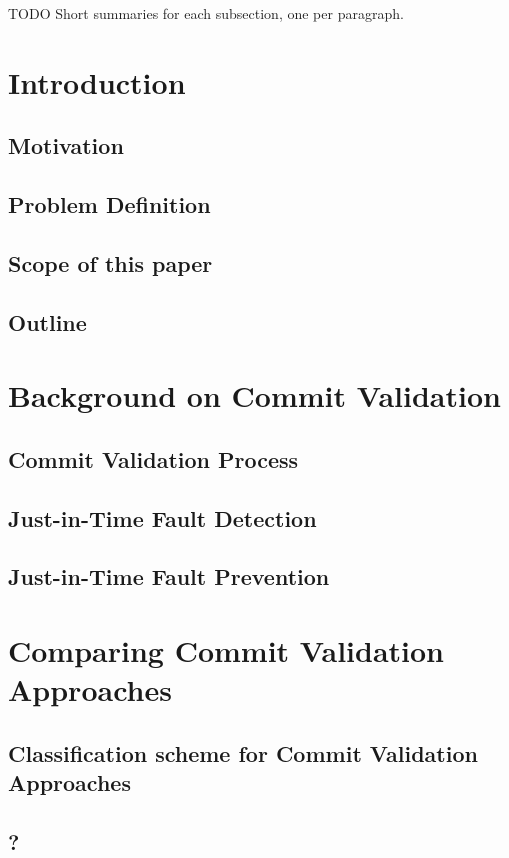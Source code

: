 TODO Short summaries for each subsection, one per paragraph.

\section{Introduction}
\subsection{Motivation}
\subsection{Problem Definition}
\subsection{Scope of this paper}
\subsection{Outline}
\section{Background on Commit Validation}
\subsection{Commit Validation Process}
\subsection{Just-in-Time Fault Detection}
\subsection{Just-in-Time Fault Prevention}
\section{Comparing Commit Validation Approaches}
\subsection{Classification scheme for Commit Validation Approaches}
\subsection{?}
